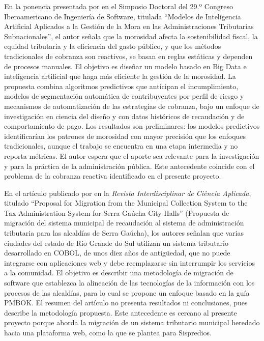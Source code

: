 \documentclass[12pt,a4paper]{report}
\begin{document}
En la ponencia presentada por \textcite{benedetto2026} en el Simposio Doctoral del 29.º Congreso Iberoamericano de Ingeniería de Software, titulada ``Modelos de Inteligencia Artificial Aplicados a la Gestión de la Mora en las Administraciones Tributarias Subnacionales'', el autor señala que la morosidad afecta la sostenibilidad fiscal, la equidad tributaria y la eficiencia del gasto público, y que los métodos tradicionales de cobranza son reactivos, se basan en reglas estáticas y dependen de procesos manuales. El objetivo es diseñar un modelo basado en Big Data e inteligencia artificial que haga más eficiente la gestión de la morosidad. La propuesta combina algoritmos predictivos que anticipan el incumplimiento, modelos de segmentación automática de contribuyentes por perfil de riesgo y mecanismos de automatización de las estrategias de cobranza, bajo un enfoque de investigación en ciencia del diseño y con datos históricos de recaudación y de comportamiento de pago. Los resultados son preliminares: los modelos predictivos identificarían los patrones de morosidad con mayor precisión que los enfoques tradicionales, aunque el trabajo se encuentra en una etapa intermedia y no reporta métricas. El autor espera que el aporte sea relevante para la investigación y para la práctica de la administración pública. Este antecedente coincide con el problema de la cobranza reactiva identificado en el presente proyecto.

En el artículo publicado por \textcite{debortoli2017} en la \textit{Revista Interdisciplinar de Ciência Aplicada}, titulado ``Proposal for Migration from the Municipal Collection System to the Tax Administration System for Serra Gaúcha City Halls'' (Propuesta de migración del sistema municipal de recaudación al sistema de administración tributaria para las alcaldías de Serra Gaúcha), los autores señalan que varias ciudades del estado de Río Grande do Sul utilizan un sistema tributario desarrollado en COBOL, de unos diez años de antigüedad, que no puede integrarse con aplicaciones web y debe reemplazarse sin interrumpir los servicios a la comunidad. El objetivo es describir una metodología de migración de software que establezca la alineación de las tecnologías de la información con los procesos de las alcaldías, para lo cual se propone un enfoque basado en la guía PMBOK. El resumen del artículo no presenta resultados ni conclusiones, pues describe la metodología propuesta. Este antecedente es cercano al presente proyecto porque aborda la migración de un sistema tributario municipal heredado hacia una plataforma web, como la que se plantea para Sispredios.
\end{document}
